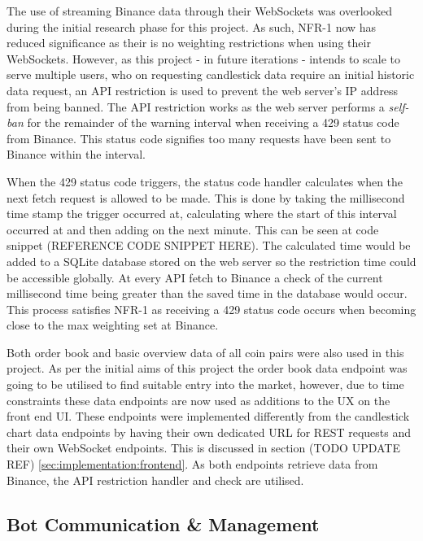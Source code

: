 The use of streaming Binance data through their WebSockets was overlooked during the initial research phase for this project. As such, NFR-1 now has reduced significance as their is no weighting restrictions when using their WebSockets. However, as this project - in future iterations - intends to scale to serve multiple users, who on requesting candlestick data require an initial historic data request, an API restriction is used to prevent the web server's IP address from being banned. The API restriction works as the web server performs a \textit{self-ban} for the remainder of the warning interval when receiving a 429 status code from Binance. This status code signifies too many requests have been sent to Binance within the interval.

When the 429 status code triggers, the status code handler calculates when the next fetch request is allowed to be made. This is done by taking the millisecond time stamp the trigger occurred at, calculating where the start of this interval occurred at and then adding on the next minute. This can be seen at code snippet (REFERENCE CODE SNIPPET HERE). The calculated time would be added to a SQLite database stored on the web server so the restriction time could be accessible globally. At every API fetch to Binance a check of the current millisecond time being greater than the saved time in the database would occur. This process satisfies NFR-1 as receiving a 429 status code occurs when becoming close to the max weighting set at Binance.

Both order book and basic overview data of all coin pairs were also used in this project. As per the initial aims of this project the order book data endpoint was going to be utilised to find suitable entry into the market, however, due to time constraints these data endpoints are now used as additions to the UX on the front end UI. These endpoints were implemented differently from the candlestick chart data endpoints by having their own dedicated URL for REST requests and their own WebSocket endpoints. This is discussed in section (TODO UPDATE REF) \ref{sec:implementation:frontend}. As both endpoints retrieve data from Binance, the API restriction handler and check are utilised.

\subsection{Bot Communication \& Management}
\label{sec:implementation:info_comm:bot_comm_management}

